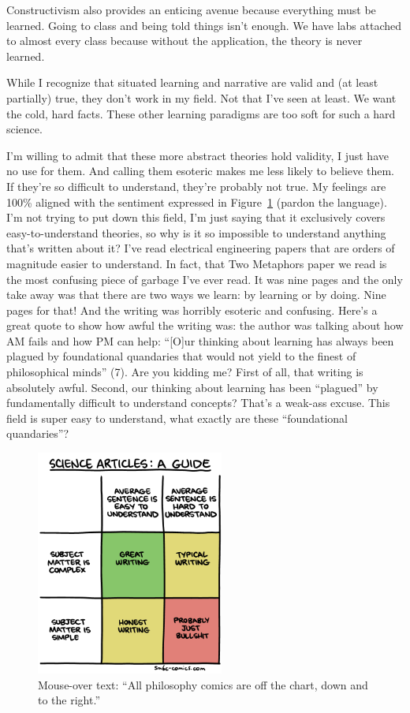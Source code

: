\documentclass[man,natbib]{apa6}
\begin{document}
Constructivism also provides an enticing avenue because everything must be learned. Going to class and being told things isn't enough. We have labs attached to almost every class because without the application, the theory is never learned.

While I recognize that situated learning and narrative are valid and (at least partially) true, they don't work in my field. Not that I've seen at least. We want the cold, hard facts. These other learning paradigms are too soft for such a hard science.

I'm willing to admit that these more abstract theories hold validity, I just have no use for them.
And calling them esoteric makes me less likely to believe them. If they're so difficult to understand, they're probably not true. My feelings are 100\% aligned with the sentiment expressed in Figure~\ref{fig:science-articles-writing} (pardon the language). I'm not trying to put down this field, I'm just saying that it exclusively covers easy-to-understand theories, so why is it so impossible to understand anything that's written about it? I've read electrical engineering papers that are orders of magnitude easier to understand. In fact, that Two Metaphors \citep{sfard1998two} paper we read is the most confusing piece of garbage I've ever read. It was nine pages and the only take away was that there are two ways we learn: by learning or by doing. Nine pages for that! And the writing was horribly esoteric and confusing.
Here's a great quote to show how awful the writing was: the author was talking about how AM fails and how PM can help: ``[O]ur thinking about learning has always been plagued by foundational quandaries that would not yield to the finest of philosophical minds'' (7). Are you kidding me? First of all, that writing is absolutely awful. Second, our thinking about learning has been ``plagued'' by fundamentally difficult to understand concepts? That's a weak-ass excuse. This field is super easy to understand, what exactly are these ``foundational quandaries''?
\begin{figure}[h]
    \centering
    \includegraphics[width=0.55\textwidth]{science-articles-writing}
    \caption{Mouse-over text: ``All philosophy comics are off the chart, down and to the right.''}
    \label{fig:science-articles-writing}
\end{figure}
\end{document}
